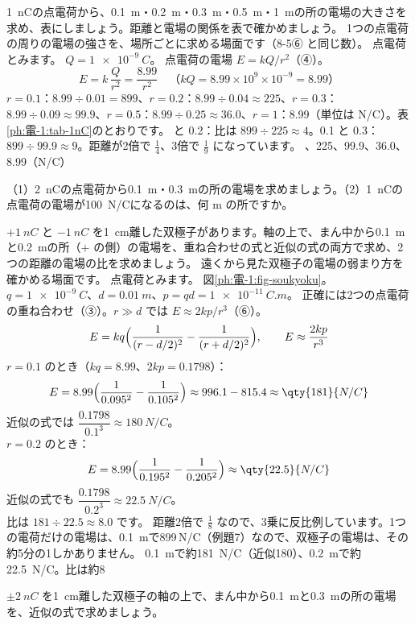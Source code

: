 \label{ph:電-1:ex7}
\begin{phreidai}[点電荷の電場の表]
\qty{1}{nC}の点電荷から、\qty{0.1}{m}・\qty{0.2}{m}・\qty{0.3}{m}・\qty{0.5}{m}・\qty{1}{m}の所の電場の大きさを求め、表にしましょう。距離と電場の関係を表で確かめましょう。
\phbamen
1つの点電荷の周りの電場の強さを、場所ごとに求める場面です（8-5⑥ と同じ数）。
\phmushi
点電荷とみます。
\phzu
$Q=\qty{1e-9}{C}$。
\phriyu
点電荷の電場 $E=kQ/r^2$（④）。
\phtateru
\[E=k\,\frac{Q}{r^2}=\frac{8.99}{r^2}\quad\text{（$kQ=8.99\times10^9\times10^{-9}=8.99$）}\]
\phtoku
$r=0.1$：$8.99\div0.01=899$、$r=0.2$：$8.99\div0.04\approx225$、$r=0.3$：$8.99\div0.09\approx99.9$、$r=0.5$：$8.99\div0.25\approx36.0$、$r=1$：8.99（単位は N/C）。表\ref{ph:電-1:tab-1nC}のとおりです。
 と 0.2：比は $899\div225\approx4$。0.1 と 0.3：$899\div99.9\approx9$。距離が2倍で $\tfrac14$、3倍で $\tfrac19$ になっています。
、225、99.9、36.0、8.99（N/C）
\end{phreidai}
\begin{jibun}
（1）\qty{2}{nC}の点電荷から\qty{0.1}{m}・\qty{0.3}{m}の所の電場を求めましょう。（2）\qty{1}{nC}の点電荷の電場が\qty{100}{N/C}になるのは、何 m の所ですか。
\end{jibun}

\label{ph:電-1:ex8}
\begin{phreidai}
$+\qty{1}{nC}$ と $-\qty{1}{nC}$ を\qty{1}{cm}離した双極子があります。軸の上で、まん中から\qty{0.1}{m}と\qty{0.2}{m}の所（$+$ の側）の電場を、重ね合わせの式と近似の式の両方で求め、2つの距離の電場の比を求めましょう。
\phbamen
遠くから見た双極子の電場の弱まり方を確かめる場面です。
\phmushi
点電荷とみます。
\phzu
図\ref{ph:電-1:fig-soukyoku}。$q=\qty{1e-9}{C}$、$d=\qty{0.01}{m}$、$p=qd=\qty{1e-11}{C.m}$。
\phriyu
正確には2つの点電荷の重ね合わせ（③）。$r\gg d$ では $E\approx2kp/r^3$（⑥）。
\phtateru
\[E=kq\Bigl(\frac{1}{(r-d/2)^2}-\frac{1}{(r+d/2)^2}\Bigr),\qquad E\approx\frac{2kp}{r^3}\]
\phtoku
$r=0.1$ のとき（$kq=8.99$、$2kp=0.1798$）：
\[E=8.99\Bigl(\frac{1}{0.095^2}-\frac{1}{0.105^2}\Bigr)\approx996.1-815.4\approx\qty{181}{N/C}\]
近似の式では $\dfrac{0.1798}{0.1^3}\approx\qty{180}{N/C}$。\\
$r=0.2$ のとき：
\[E=8.99\Bigl(\frac{1}{0.195^2}-\frac{1}{0.205^2}\Bigr)\approx\qty{22.5}{N/C}\]
近似の式でも $\dfrac{0.1798}{0.2^3}\approx\qty{22.5}{N/C}$。\\
比は $181\div22.5\approx8.0$ です。
\phtashikame
距離2倍で $\tfrac18$ なので、3乗に反比例しています。1つの電荷だけの電場は、\qty{0.1}{m}で899\,N/C（例題7）なので、双極子の電場は、その約5分の1しかありません。
\kotae \qty{0.1}{m}で約\qty{181}{N/C}（近似180）、\qty{0.2}{m}で約\qty{22.5}{N/C}。比は約8
\end{phreidai}
\begin{jibun}
$\pm\qty{2}{nC}$ を\qty{1}{cm}離した双極子の軸の上で、まん中から\qty{0.1}{m}と\qty{0.3}{m}の所の電場を、近似の式で求めましょう。
\end{jibun}

